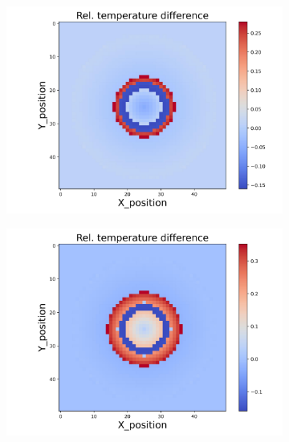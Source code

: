 \begin{figure}[h]
\begin{minipage}{\textwidth}
\begin{subfigure}{0.325\textwidth}
        \end{subfigure}
        \begin{subfigure}{0.325\textwidth}
            \centering
            \includegraphics[width=\textwidth]{figures/raw_data/23/quad/T_bias.jpg}
        \end{subfigure}
        \begin{subfigure}{0.325\textwidth}
            \centering
            \includegraphics[width=\textwidth]{figures/raw_data/24/quad/T_bias.jpg}
        \end{subfigure}
    \end{minipage}\\

\end{figure}
